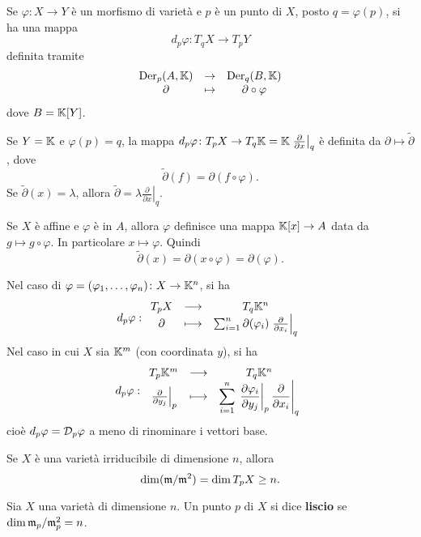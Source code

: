 \begin{remark}
    Se $\varphi\colon X \to Y$ è un morfismo di varietà e $p$ è un punto di $X$, posto $q=\varphi(p)$, si ha una mappa \[d_p\varphi \colon  T_qX \to  T_p Y\] definita tramite
    \[\begin{array}{ccc}
         \operatorname{Der}_p(A,\mathbb{K}) &\to & \operatorname{Der}_q(B,\mathbb{K})  \\
        \partial &\mapsto & \partial\circ \varphi
    \end{array}\]
    dove $B=\mathbb{K}[Y]$. 
\end{remark}

\begin{example}
Se $Y=\mathbb{K}$ e $\varphi(p)=q$, la mappa $d_p\varphi\colon T_p X \to T_q \mathbb{K}=\mathbb{K} \left.\frac{\partial}{\partial x}\right\lvert_q$ è definita da $\partial \mapsto \widetilde{\partial}$, dove 
\[\widetilde{\partial}(f)=\partial(f\circ \varphi).\] 
Se $\widetilde{\partial}(x)=\lambda$, allora $\widetilde{\partial}=\lambda\left.\frac{\partial}{\partial x}\right\lvert_q $.
\end{example}

\begin{remark}
Se $X$ è affine e $\varphi$ è in $A$, allora $\varphi$ definisce una mappa $\mathbb{K}[x]\to A$ data da $g\mapsto g\circ \varphi$. In particolare $x\mapsto \varphi$. Quindi \[\widetilde{\partial}(x)=\partial(x\circ \varphi)=\partial(\varphi).\]
\end{remark}


\begin{remark}
Nel caso di $\varphi=(\varphi_1,\ldots,\varphi_n)\colon X \to \mathbb{K}^n$, si ha \[d_p\varphi:\begin{array}{ccc} {T_pX} & \longrightarrow & {T_q \mathbb{K}^n}\\ {\partial} & \longmapsto & {\sum_{i=1}^n \partial(\varphi_i)\left.\frac{\partial}{\partial x_i}\right\lvert_q} \end{array}\]
Nel caso in cui $X$ sia $\mathbb{K}^m$ (con coordinata $y$), si ha
\[d_p\varphi:\begin{array}{ccc} {T_p\mathbb{K}^m} & \longrightarrow & {T_q \mathbb{K}^n}\\ {\left.\frac{\partial}{\partial y_j}\right\lvert_p} & \longmapsto & {\displaystyle\sum_{i=1}^n \left.\left.\frac{\partial \varphi_i}{\partial y_j} \right\lvert_p\frac{\partial}{\partial x_i}\right\lvert_q} \end{array}\]
cio\`e $d_p\varphi=\mathcal{D}_p\varphi$ a meno di rinominare i vettori base.
\end{remark}



\begin{theorem}
    Se $X$ è una varietà irriducibile di dimensione $n$, allora \[\dim(\mathfrak{m}/\mathfrak{m}^2)=\dim T_pX \ge n.\]
\end{theorem}

\begin{definition}
    Sia $X$ una varietà di dimensione $n$. Un punto $p$ di $X$ si dice \textbf{liscio} se $\dim \mathfrak{m}_p/\mathfrak{m}_p^2 =n$.
\end{definition}

